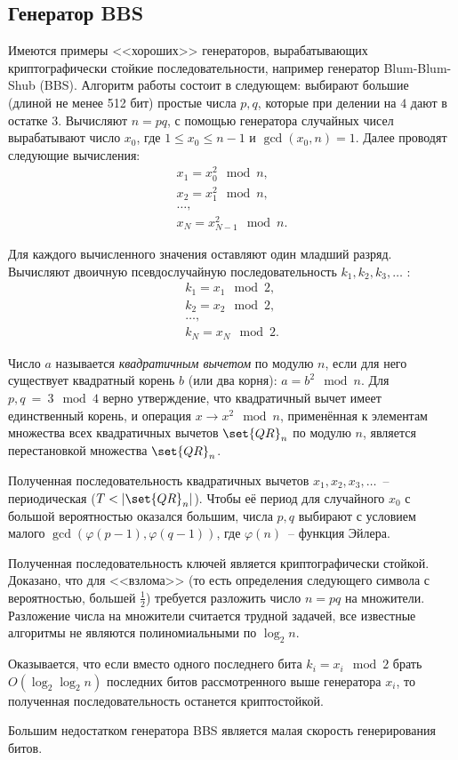 \subsection{Генератор BBS}

Имеются примеры <<хороших>> генераторов, вырабатывающих криптографически стойкие последовательности, например генератор Blum-Blum-Shub (BBS). Алгоритм работы состоит в следующем: выбирают большие (длиной не менее 512 бит) простые числа $p, q$, которые при делении на $4$ дают в остатке $3$. Вычисляют $n = p q$, с помощью генератора случайных чисел вырабатывают число $x_{0}$, где $1 \leq x_0 \leq n-1$ и $\gcd(x_0, n) = 1$. Далее проводят следующие вычисления:
\[ \begin{array}{l}
        x_{1} = x_{0}^{2} \mod n,\\
        x_{2} = x_{1}^{2} \mod n,\\
        \dots,\\
        x_{N} = x_{N-1}^{2} \mod n.
\end{array} \]

Для каждого вычисленного значения оставляют один младший разряд. Вычисляют двоичную псевдослучайную последовательность $k_1, k_2, k_3, \dots$ :
\[ \begin{array}{l}
        k_{1} = x_{1} \mod 2,\\
        k_{2} = x_{2} \mod 2,\\
        \dots,\\
        k_{N} = x_{N} \mod 2.
\end{array} \]

Число $a$ называется \emph{квадратичным вычетом} по модулю $n$, если для него существует квадратный корень $b$ (или два корня): $a = b^2 \mod n$. Для $p,q ~=~ 3 \mod 4$ верно утверждение, что квадратичный вычет имеет единственный корень, и операция $x \rightarrow x^2 \mod n$, применённая к элементам множества всех квадратичных вычетов $\set{QR}_n$ по модулю $n$, является перестановкой множества $\set{QR}_n$.

Полученная последовательность квадратичных вычетов $x_1, x_2, x_3, \dots$~-- периодическая ($T < |\set{QR}_n|$). Чтобы её период для случайного $x_0$ с большой вероятностью оказался большим, числа $p,q$ выбирают с условием малого $\gcd(\varphi(p-1), \varphi(q-1))$, где $\varphi(n)$~-- функция Эйлера.

Полученная последовательность ключей является криптографически стойкой. Доказано, что для <<взлома>> (то есть определения следующего символа с вероятностью, большей $\frac{1}{2}$) требуется разложить число $n=pq$ на множители. Разложение числа на множители считается трудной задачей, все известные алгоритмы не являются полиномиальными по $\log_2 n$.

Оказывается, что если вместо одного последнего бита $k_i = x_i \mod 2$ брать $O(\log_2 \log_2 n)$ последних битов рассмотренного выше генератора $x_i$, то полученная последовательность останется криптостойкой.

Большим недостатком генератора BBS является малая скорость генерирования битов.
